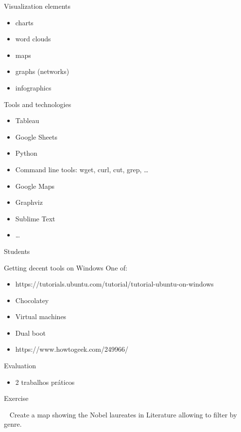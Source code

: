 \documentclass[serif,14pt,color=usenames,dvipsnames]{beamer}
\begin{document}
\begin{frame}{Visualization elements}
  \begin{itemize}
    \item charts
    \item word clouds
    \item maps
    \item graphs (networks)
    \item infographics
  \end{itemize}
\end{frame}

\begin{frame}{Tools and technologies}
  \begin{itemize}
    \item Tableau
    \item Google Sheets
    \item Python
    \item Command line tools: wget, curl, cut, grep, \dots
    \item Google Maps
    \item Graphviz
    \item Sublime Text
    \item \dots
  \end{itemize}
\end{frame}

\begin{frame}{Students}
\end{frame}


\begin{frame}{Getting decent tools on Windows}
  One of:
\begin{itemize}
  \item
    {\small{https://tutorials.ubuntu.com/tutorial/tutorial-ubuntu-on-windows}}
  \item Chocolatey
  \item Virtual machines
  \item Dual boot
  \item https://www.howtogeek.com/249966/
\end{itemize}
\end{frame}


\begin{frame}{Evaluation}
  \begin{itemize}
    \item 2 trabalhos práticos
  \end{itemize}
\end{frame}


\begin{frame}{Exercise}
  \begin{block}{~}
    Create a map showing the Nobel laureates in Literature allowing to filter by genre.
  \end{block}
\end{frame}
\end{document}
